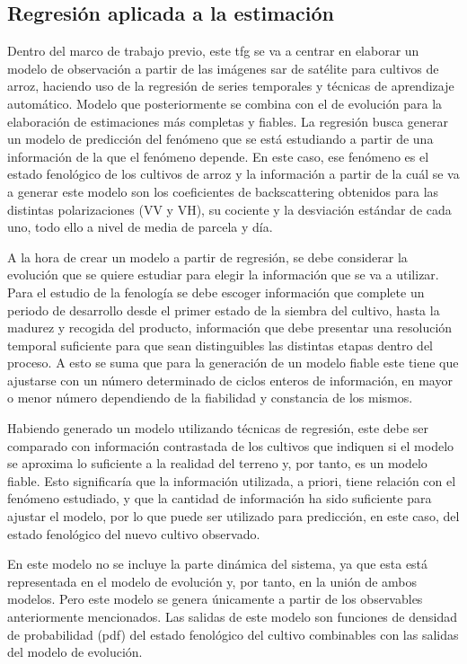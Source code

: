 \subsection{Regresión aplicada a la estimación}
\par Dentro del marco de trabajo previo, este \gls{tfg} se va a centrar en elaborar un modelo de observación a partir de las imágenes \gls{sar} de satélite para cultivos de arroz, haciendo uso de la regresión de series temporales y técnicas de aprendizaje automático. Modelo que posteriormente se combina con el de evolución para la elaboración de estimaciones más completas y fiables. La regresión busca generar un modelo de predicción del fenómeno que se está estudiando a partir de una información de la que el fenómeno depende. En este caso, ese fenómeno es el estado fenológico de los cultivos de arroz y la información a partir de la cuál se va a generar este modelo son los coeficientes de backscattering obtenidos para las distintas polarizaciones (VV y VH), su cociente y la desviación estándar de cada uno, todo ello a nivel de media de parcela y día.
\\
\par A la hora de crear un modelo a partir de regresión, se debe considerar la evolución que se quiere estudiar para elegir la información que se va a utilizar. Para el estudio de la fenología se debe escoger información que complete un periodo de desarrollo desde el primer estado de la siembra del cultivo, hasta la madurez y recogida del producto, información que debe presentar una resolución temporal suficiente para que sean distinguibles las distintas etapas dentro del proceso. A esto se suma que para la generación de un modelo fiable este tiene que ajustarse con un número determinado de ciclos enteros de información, en mayor o menor número dependiendo de la fiabilidad y constancia de los mismos. 
\\
\par Habiendo generado un modelo utilizando técnicas de regresión, este debe ser comparado con información contrastada de los cultivos que indiquen si el modelo se aproxima lo suficiente a la realidad del terreno y, por tanto, es un modelo fiable. Esto significaría que la información utilizada, a priori, tiene relación con el fenómeno estudiado, y que la cantidad de información ha sido suficiente para ajustar el modelo, por lo que puede ser utilizado para predicción, en este caso, del estado fenológico del nuevo cultivo observado. 
\\
\par En este modelo no se incluye la parte dinámica del sistema, ya que esta está representada en el modelo de evolución y, por tanto, en la unión de ambos modelos. Pero este modelo se genera únicamente a partir de los observables anteriormente mencionados. Las salidas de este modelo son funciones de densidad de probabilidad (\gls{pdf}) del estado fenológico del cultivo combinables con las salidas del modelo de evolución. 
